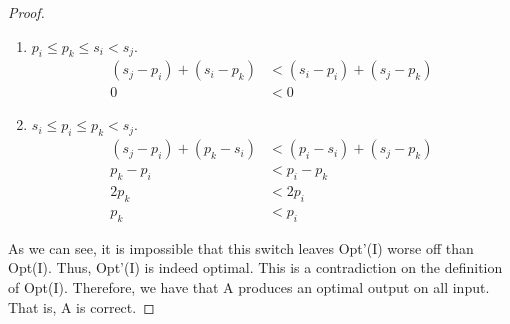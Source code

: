 \documentclass{article}
\begin{document}
\begin{enumerate}[label=(\alph*)]
\begin{proof}
\begin{enumerate}[label=Case \arabic*.]
                \item $ p_i \leq p_k \leq s_i < s_j $.
                \begin{align*}
                    (s_j - p_i) + (s_i - p_k) &< (s_i - p_i) + (s_j - p_k)\\
                    0 &< 0
                \end{align*}
                
                \item $ s_i \leq p_i \leq p_k < s_j $.
                \begin{align*}
                    (s_j - p_i) + (p_k - s_i) &< (p_i - s_i) + (s_j - p_k)\\
                    p_k - p_i &< p_i - p_k\\
                    2p_k &< 2p_i\\
                    p_k &< p_i
                \end{align*}
            \end{enumerate}
            
            As we can see, it is impossible that this switch leaves Opt'(I) worse off than Opt(I).
            Thus, Opt'(I) is indeed optimal.
            This is a contradiction on the definition of Opt(I).
            Therefore, we have that A produces an optimal output on all input.
            That is, A is correct.
        \end{proof}
    \end{enumerate}
\end{document}
